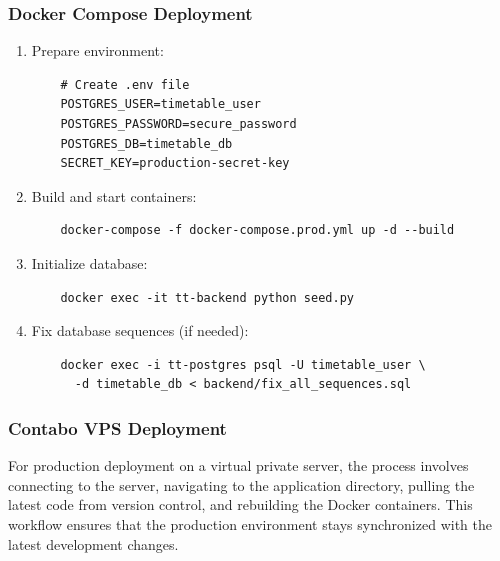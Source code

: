 \documentclass[12pt,a4paper]{article}
\begin{document}
\subsubsection{Docker Compose Deployment}
\begin{enumerate}
    \item Prepare environment:
    \begin{verbatim}
    # Create .env file
    POSTGRES_USER=timetable_user
    POSTGRES_PASSWORD=secure_password
    POSTGRES_DB=timetable_db
    SECRET_KEY=production-secret-key
    \end{verbatim}
    
    \item Build and start containers:
    \begin{verbatim}
    docker-compose -f docker-compose.prod.yml up -d --build
    \end{verbatim}
    
    \item Initialize database:
    \begin{verbatim}
    docker exec -it tt-backend python seed.py
    \end{verbatim}
    
    \item Fix database sequences (if needed):
    \begin{verbatim}
    docker exec -i tt-postgres psql -U timetable_user \
      -d timetable_db < backend/fix_all_sequences.sql
    \end{verbatim}
\end{enumerate}

\subsubsection{Contabo VPS Deployment}

For production deployment on a virtual private server, the process involves connecting to the server, navigating to the application directory, pulling the latest code from version control, and rebuilding the Docker containers. This workflow ensures that the production environment stays synchronized with the latest development changes.
\end{document}
